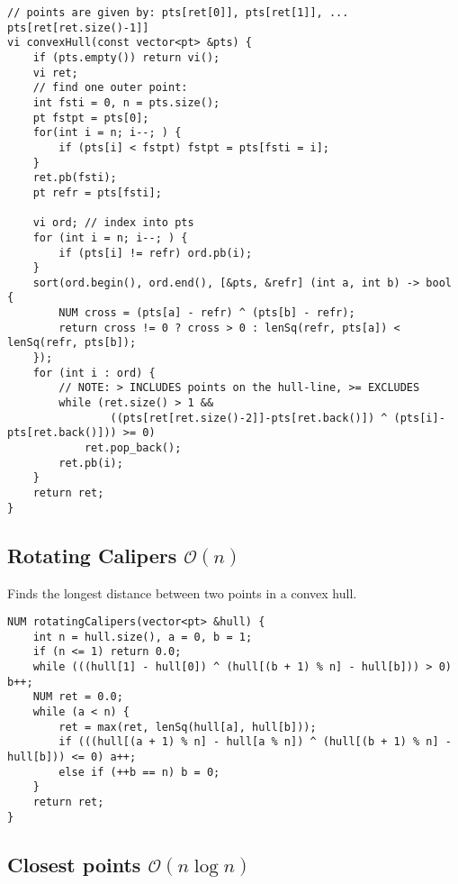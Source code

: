 \documentclass{article}
\begin{document}
\begin{lstlisting}
// points are given by: pts[ret[0]], pts[ret[1]], ... pts[ret[ret.size()-1]]
vi convexHull(const vector<pt> &pts) {
	if (pts.empty()) return vi();
	vi ret;
	// find one outer point:
	int fsti = 0, n = pts.size();
	pt fstpt = pts[0];
	for(int i = n; i--; ) {
		if (pts[i] < fstpt) fstpt = pts[fsti = i];
	}
	ret.pb(fsti);
	pt refr = pts[fsti];

	vi ord; // index into pts
	for (int i = n; i--; ) {
		if (pts[i] != refr) ord.pb(i);
	}
	sort(ord.begin(), ord.end(), [&pts, &refr] (int a, int b) -> bool {
		NUM cross = (pts[a] - refr) ^ (pts[b] - refr);
		return cross != 0 ? cross > 0 : lenSq(refr, pts[a]) < lenSq(refr, pts[b]);
	});
	for (int i : ord) {
		// NOTE: > INCLUDES points on the hull-line, >= EXCLUDES
		while (ret.size() > 1 && 
				((pts[ret[ret.size()-2]]-pts[ret.back()]) ^ (pts[i]-pts[ret.back()])) >= 0)
			ret.pop_back();
		ret.pb(i);
	}
	return ret;
}
\end{lstlisting}

\subsection{Rotating Calipers $\mathcal{O}(n)$}

Finds the longest distance between two points in a convex hull.

\begin{lstlisting}
NUM rotatingCalipers(vector<pt> &hull) {
	int n = hull.size(), a = 0, b = 1;
	if (n <= 1) return 0.0;
	while (((hull[1] - hull[0]) ^ (hull[(b + 1) % n] - hull[b])) > 0) b++;
	NUM ret = 0.0;
	while (a < n) {
		ret = max(ret, lenSq(hull[a], hull[b]));
		if (((hull[(a + 1) % n] - hull[a % n]) ^ (hull[(b + 1) % n] - hull[b])) <= 0) a++;
		else if (++b == n) b = 0;
	}
	return ret;
}
\end{lstlisting}

\subsection{Closest points $\mathcal{O}(n \log n)$}
\end{document}
